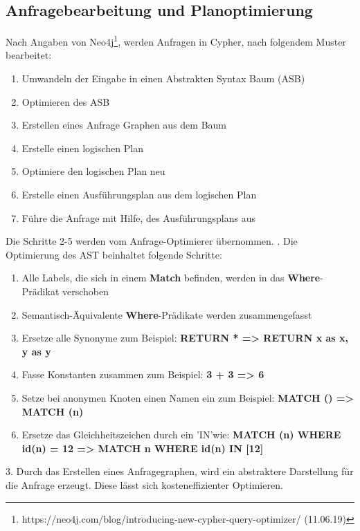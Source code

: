 \subsection{Anfragebearbeitung und Planoptimierung}
Nach Angaben von Neo4j\footnote{https://neo4j.com/blog/introducing-new-cypher-query-optimizer/  (11.06.19)}, werden Anfragen in Cypher, nach folgendem Muster bearbeitet:
\begin{enumerate}
	\item Umwandeln der Eingabe in einen Abstrakten Syntax Baum (ASB)
	\item Optimieren des ASB
	\item Erstellen eines Anfrage Graphen aus dem Baum
	\item Erstelle einen logischen Plan
	\item Optimiere den logischen Plan neu
	\item Erstelle einen Ausführungsplan aus dem logischen Plan
	\item Führe die Anfrage mit Hilfe, des Ausführungsplans aus 
\end{enumerate}
Die Schritte 2-5 werden vom Anfrage-Optimierer übernommen. \newline
{}. Die Optimierung des AST beinhaltet folgende Schritte: 
\begin{enumerate}
	\item Alle Labels, die sich in einem \textbf{Match} befinden, werden in das \textbf{Where}-Prädikat verschoben
	\item  Semantisch-Äquivalente \textbf{Where}-Prädikate werden zusammengefasst
	\item Ersetze alle Synonyme zum Beispiel: \textbf{RETURN * => RETURN x as x, y as y}
	\item Fasse Konstanten zusammen zum Beispiel: \textbf{3 + 3 => 6}
	\item Setze bei anonymen Knoten einen Namen ein zum Beispiel: \textbf{ MATCH () => MATCH (n)}
	\item Ersetze das Gleichheitszeichen durch ein 'IN'wie: \textbf{MATCH (n) WHERE id(n) = 12 => MATCH n WHERE id(n) IN [12]}
\end{enumerate}
3. Durch das Erstellen eines Anfragegraphen, wird ein abstraktere Darstellung für die Anfrage erzeugt. Diese lässt sich kosteneffizienter Optimieren.	 \newline \newline
